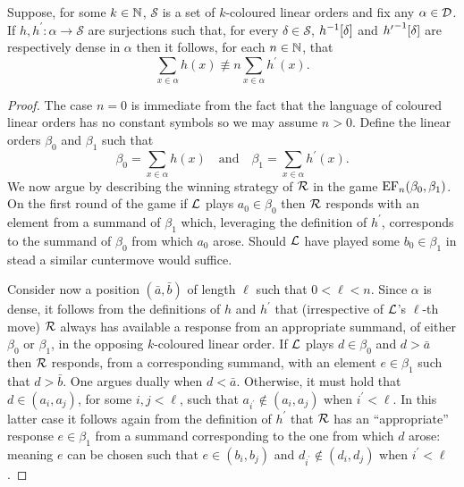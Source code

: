 \begin{prp}\label{prp:dsum}
	Suppose, for some $k\in\mathbb{N}$, $\mathcal{S}$ is a set of $k$-coloured linear orders and fix any $\alpha\in\mathcal{D}$.  If $h,h^\prime\colon\alpha\to\mathcal{S}$ are surjections such that, for every $\delta\in\mathcal{S}$, ${h}^{-1}[\delta]$ and ${h^\prime}^{-1}[\delta]$ are respectively dense in $\alpha$ then it follows, for each $n\in\mathbb{N}$, that
	\begin{equation}
		\sum_{x\in\alpha}h(x)\nequiv{n}\sum_{x\in\alpha}h^\prime(x).
	\end{equation}
\end{prp}
\begin{proof}
	The case $n=0$ is immediate from the fact that the language of coloured linear orders has no constant symbols so we may assume $n>0$.  Define the linear orders $\beta_0$ and $\beta_1$ such that
	\begin{equation}
		\beta_0=\sum_{x\in\alpha}h(x)\quad\text{and}\quad\beta_1=\sum_{x\in\alpha}h^\prime(x).
	\end{equation}
	We now argue by describing the winning strategy of $\mathcal{R}$ in the game $\operatorname{EF}_n(\beta_0,\beta_1)$.  On the first round of the game if $\mathcal{L}$ plays $a_0\in\beta_0$ then $\mathcal{R}$ responds with an element from a summand of $\beta_1$ which, leveraging the definition of $h^\prime$, corresponds to the summand of $\beta_0$ from which $a_0$ arose.  Should $\mathcal{L}$ have played some $b_0\in\beta_1$ in stead a similar cuntermove would suffice.

	Consider now a position $(\bar{a},\bar{b})$ of length $\ell$ such that $0<\ell<n$.  Since $\alpha$ is dense, it follows from the definitions of $h$ and $h^\prime$ that (irrespective of $\mathcal{L}$'s $\ell$-th move) $\mathcal{R}$ always has available a response from an appropriate summand, of either $\beta_0$ or $\beta_1$, in the opposing $k$-coloured linear order.  If $\mathcal{L}$ plays $d\in\beta_0$ and $d>\bar{a}$ then $\mathcal{R}$ responds, from a corresponding summand, with an element $e\in\beta_1$ such that $d>\bar{b}$.  One argues dually when $d<\bar{a}$.  Otherwise, it must hold that $d\in(a_i,a_j)$, for some $i,j<\ell$, such that $a_{i^\prime}\notin(a_i,a_j)$ when $i^\prime<\ell$.  In this latter case it follows again from the definition of $h^\prime$ that $\mathcal{R}$ has an ``appropriate'' response $e\in\beta_1$ from a summand corresponding to the one from which $d$ arose: meaning $e$ can be chosen such that $e\in(b_i,b_j)$ and $d_{i^\prime}\notin(d_i,d_j)$ when $i^\prime<\ell$.
\end{proof}

